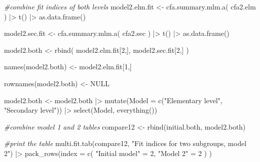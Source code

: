 \documentclass[
]{article}
\newenvironment{Shaded}{\begin{snugshade}}{\end{snugshade}}
\newcommand{\AttributeTok}[1]{\textcolor[rgb]{0.77,0.63,0.00}{#1}}
\newcommand{\CommentTok}[1]{\textcolor[rgb]{0.56,0.35,0.01}{\textit{#1}}}
\newcommand{\ConstantTok}[1]{\textcolor[rgb]{0.00,0.00,0.00}{#1}}
\newcommand{\DecValTok}[1]{\textcolor[rgb]{0.00,0.00,0.81}{#1}}
\newcommand{\FunctionTok}[1]{\textcolor[rgb]{0.00,0.00,0.00}{#1}}
\newcommand{\NormalTok}[1]{#1}
\newcommand{\OtherTok}[1]{\textcolor[rgb]{0.56,0.35,0.01}{#1}}
\newcommand{\SpecialCharTok}[1]{\textcolor[rgb]{0.00,0.00,0.00}{#1}}
\newcommand{\StringTok}[1]{\textcolor[rgb]{0.31,0.60,0.02}{#1}}
\begin{document}
\begin{Shaded}
\begin{Highlighting}[]
\CommentTok{\#combine fit indices of both levels}
\NormalTok{model2.elm.fit }\OtherTok{\textless{}{-}} 
  \FunctionTok{cfa.summary.mlm.a}\NormalTok{(}
\NormalTok{    cfa2.elm}
\NormalTok{    ) }\SpecialCharTok{|\textgreater{}} 
  \FunctionTok{t}\NormalTok{() }\SpecialCharTok{|\textgreater{}} 
  \FunctionTok{as.data.frame}\NormalTok{()}

\NormalTok{model2.sec.fit }\OtherTok{\textless{}{-}} 
  \FunctionTok{cfa.summary.mlm.a}\NormalTok{(}
\NormalTok{    cfa2.sec}
\NormalTok{    ) }\SpecialCharTok{|\textgreater{}} 
  \FunctionTok{t}\NormalTok{() }\SpecialCharTok{|\textgreater{}} 
  \FunctionTok{as.data.frame}\NormalTok{()}

\NormalTok{model2.both }\OtherTok{\textless{}{-}} 
  \FunctionTok{rbind}\NormalTok{(}
\NormalTok{    model2.elm.fit[}\DecValTok{2}\NormalTok{,], }
\NormalTok{    model2.sec.fit[}\DecValTok{2}\NormalTok{,]}
\NormalTok{    ) }

\FunctionTok{names}\NormalTok{(model2.both) }\OtherTok{\textless{}{-}}\NormalTok{ model2.elm.fit[}\DecValTok{1}\NormalTok{,]}

\FunctionTok{rownames}\NormalTok{(model2.both) }\OtherTok{\textless{}{-}} \ConstantTok{NULL}

\NormalTok{model2.both }\OtherTok{\textless{}{-}} 
\NormalTok{  model2.both }\SpecialCharTok{|\textgreater{}} 
  \FunctionTok{mutate}\NormalTok{(}\AttributeTok{Model =} \FunctionTok{c}\NormalTok{(}\StringTok{"Elementary level"}\NormalTok{,}
    \StringTok{"Secondary level"}\NormalTok{)) }\SpecialCharTok{|\textgreater{}} 
  \FunctionTok{select}\NormalTok{(Model, }\FunctionTok{everything}\NormalTok{())}

\CommentTok{\#combine model 1 and 2 tables}
\NormalTok{compare12 }\OtherTok{\textless{}{-}} \FunctionTok{rbind}\NormalTok{(initial.both, model2.both)}

\CommentTok{\#print the table}
\FunctionTok{multi.fit.tab}\NormalTok{(compare12, }
              \StringTok{"Fit indices for two subgroups, model 2"}\NormalTok{) }\SpecialCharTok{|\textgreater{}} 
  \FunctionTok{pack\_rows}\NormalTok{(}\AttributeTok{index =} \FunctionTok{c}\NormalTok{(}
    \StringTok{"Initial model"} \OtherTok{=} \DecValTok{2}\NormalTok{,}
    \StringTok{"Model 2"} \OtherTok{=} \DecValTok{2}
\NormalTok{  )}
\NormalTok{  )}
\end{Highlighting}
\end{Shaded}
\end{document}
